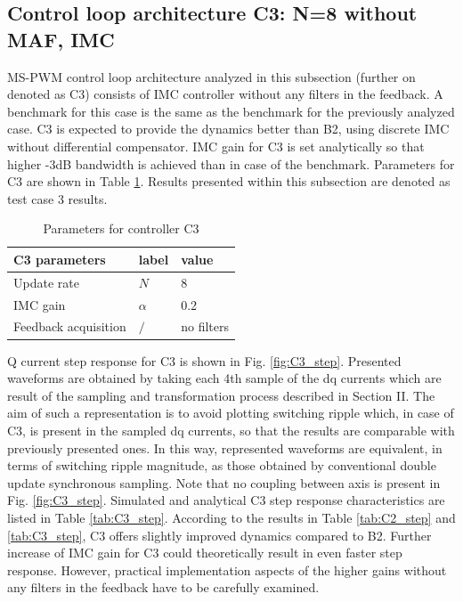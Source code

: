 \documentclass[journal]{IEEEtran}
\begin{document}
\subsection{Control loop architecture C3: N=8 without MAF, IMC}
MS-PWM control loop architecture analyzed in this subsection (further on denoted as C3) consists of IMC controller without any filters in the feedback. A benchmark for this case is the same as the benchmark for the previously analyzed case. C3
is expected to provide the dynamics better than B2, using discrete IMC
without differential compensator. IMC gain for C3 is set analytically so
that higher -3dB bandwidth is achieved than in case of the benchmark. Parameters for C3 are shown in Table \ref{tab: case 3}. Results presented within this subsection are denoted as test case 3 results. 

\begin{table}[h!]
			  \caption{Parameters for controller C3}
              \label{tab: case 3}
              \centering
              \begin{tabular}{lll}
                           \midrule\midrule
        C3 parameters     & label           & value\\
        \midrule               
                  Update rate   	& $N$      & 8\\  
                  IMC gain    & $\alpha$      & 0.2    \\
                  Feedback acquisition    & $/$      & no filters\\
                  \midrule\midrule

              \end{tabular}
\end{table}
Q current step response for C3 is shown in Fig. \ref{fig:C3_step}. Presented waveforms are obtained by taking each 4th sample of the dq currents which are result of the sampling and transformation process described in Section II. The aim of such a representation is to avoid plotting switching ripple which, in case of C3, is present in the sampled dq currents, so that the results are comparable with previously presented ones. In this way, represented waveforms are equivalent, in terms of switching ripple magnitude, as those obtained by conventional double update synchronous sampling. Note that no coupling between axis is present in Fig. \ref{fig:C3_step}. Simulated and analytical C3 step response characteristics are listed in Table \ref{tab:C3_step}. According to the results in Table \ref{tab:C2_step} and \ref{tab:C3_step}, C3 offers slightly improved dynamics compared to B2. Further increase of IMC gain for C3 could theoretically result in even faster step response. However, practical implementation aspects of the higher gains without any filters in the feedback have to be carefully examined. 
\end{document}
